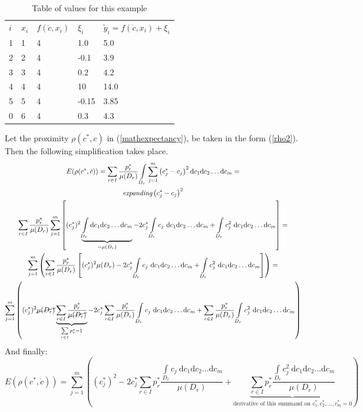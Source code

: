 \documentclass[a4paper]{article}
\numberwithin{equation}{subsection}
\begin{document}
\begin{table}[h!]
\caption {Table of values for this example} \label{tab:title} 
\centering
\begin{tabular}{lllll}
$i$ & $x_{i}$ & $f(\dot{c},x_{i})$ & $\xi_{i}$  & $\tilde{y}_{i}=f(\dot{c},x_{i})+\xi_{i}$  \\
1 & 1 & 4      & 1.0   & 5.0   \\
2 & 2 & 4      & -0.1  & 3.9   \\
3 & 3 & 4      & 0.2   & 4.2   \\
4 & 4 & 4      & 10    & 14.0  \\
5 & 5 & 4      & -0.15 & 3.85  \\
0 & 6 & 4      & 0.3   & 4.3  
\end{tabular}
\end{table}
\newpage 
Let the proximity $\rho(c^{*},c)$ in (\ref{mathexpectancy}), be taken in the form (\ref{rho2}). Then the following simplification takes place.
\begin{gather}
\nonumber
E(\rho(c^{*},\dot{c}))=\sum\limits_{r \in I} \frac{p_{r}^{*}}{\mu(D_{r})} \int\limits_{D_{r}}\sum\limits_{j=1}^{m} \left( c_{j}^{*}-c_{j} \right)^{2}\mathrm{d}c_{1}\mathrm{d}c_{2}\dots \mathrm{d}c_{m} = \\
\nonumber
\textit{expanding} \left( c_{j}^{*}-c_{j} \right)^{2} \\
\nonumber
\sum\limits_{r \in I} \frac{p_{r}^{*}}{\mu(D_{r})} \sum\limits_{j=1}^{m} \left[ (c_{j}^{*})^{2} \underbrace{\int\limits_{D_{r}} \mathrm{d}c_{1}\mathrm{d}c_{2}\dots \mathrm{d}c_{m}}_{{=\mu(D_{r})}} - 2c_{j}^{*} \int\limits_{D_{r}} c_{j} \  \mathrm{d}c_{1}\mathrm{d}c_{2}\dots \mathrm{d}c_{m} + \int\limits_{D_{r}} c_{j}^{2} \  \mathrm{d}c_{1}\mathrm{d}c_{2}\dots \mathrm{d}c_{m}\right]= \\
\nonumber
\sum\limits_{j=1}^{m} \left( \sum\limits_{r \in I} \frac{p_{r}^{*}}{\mu(D_{r})} \left[ (c_{j}^{*})^{2} \mu(D_{r})-2c_{j}^{*} \int\limits_{D_{r}} c_{j} \  \mathrm{d}c_{1}\mathrm{d}c_{2}\dots \mathrm{d}c_{m} + \int\limits_{D_{r}} c_{j}^{2} \  \mathrm{d}c_{1}\mathrm{d}c_{2}\dots \mathrm{d}c_{m} \right] \right) = \\ 
\sum\limits_{j=1}^{m} \left( (c_{j}^{*})^{2} \cancel{\mu(D_{r})} \underbrace{\sum\limits_{r \in I} \frac{p_{r}^{*}}{\cancel{\mu(D_{r})}}}_{\sum\limits_{r \in I}p_{r}^{*} = 1} - 2c_{j}^{*} \sum\limits_{r \in I}\frac{p_{r}^{*}}{\mu(D_{r})} \int\limits_{D_{r}} c_{j} \  \mathrm{d}c_{1}\mathrm{d}c_{2}\dots \mathrm{d}c_{m} + \sum\limits_{r \in I}\frac{p_{r}^{*}}{\mu(D_{r})} \int\limits_{D_{r}} c_{j}^{2} \  \mathrm{d}c_{1}\mathrm{d}c_{2}\dots \mathrm{d}c_{m} \right)
\end{gather}
And finally:
\begin{equation}
E(\rho(c^{*},\dot{c}))= \sum\limits_{j=1}^{m} \left( (c_{j}^{*})^{2} - 2c_{j}^{*} \sum\limits_{r \in I} p_{r}^{*} \frac{\int\limits_{D_{r}} c_{j} \  \mathrm{d}c_{1}\mathrm{d}c_{2}\dots \mathrm{d}c_{m}}{\mu(D_{r})} + \underbrace{\sum\limits_{r \in I} p_{r}^{*} \frac{\int\limits_{D_{r}} c_{j}^{2} \  \mathrm{d}c_{1}\mathrm{d}c_{2}\dots \mathrm{d}c_{m}}{\mu(D_{r})}}_{\text{derivative of this summand on } c_{1}^{*}, c_{2}^{*},\dots,c_{m}^{*} = 0} \right)
\end{equation}
\end{document}
